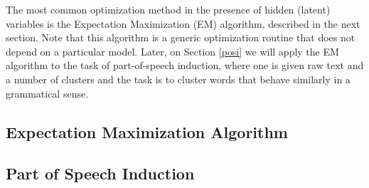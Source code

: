The most common optimization method in the presence of hidden (latent) variables is the Expectation Maximization (EM) algorithm, described in the next section. Note that this algorithm is a generic optimization routine that does not depend on a particular model. Later, on Section \ref{posi} we will apply the EM algorithm to the task of part-of-speech induction, where one is given raw text and a number of clusters and the task is to cluster words that behave similarly in a grammatical sense. 

\subsection{\label{em}Expectation Maximization Algorithm}




\subsection{\label{posi}Part of Speech Induction}




